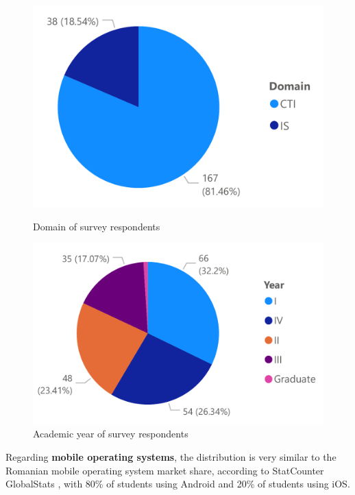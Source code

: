 \begin{figure}[!ht]
    \centering
    \begin{minipage}[b]{0.49\textwidth}
        \captionsetup{justification=centering}
         \includegraphics[height=0.2\textheight]{figures/charts/survey/domain.pdf}
        \caption{Domain of survey respondents}
        \label{3:fig:domain}
    \end{minipage}
    \hfill
    \begin{minipage}[b]{0.49\textwidth}
        \captionsetup{justification=centering}
         \includegraphics[height=0.2\textheight]{figures/charts/survey/year.pdf}
        \caption{Academic year of survey respondents}
        \label{3:fig:year}
    \end{minipage}
\end{figure}

Regarding \textbf{mobile operating systems}, the distribution is very similar to the Romanian mobile operating system market share, according to StatCounter GlobalStats \cite{statcounter2020mobile}, with 80\% of students using Android and 20\% of students using iOS.

